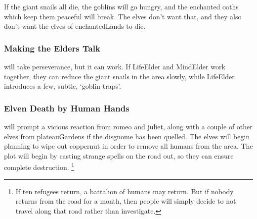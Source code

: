 \begin{multicols}{2}
If the giant snails all die, the goblins will go hungry, and the enchanted oaths which keep them peaceful will break.
The elves don't want that, and they also don't want the elves of \gls{enchantedLands} to die.

\stopcontents[segments]

\subsubsection{Making the Elders Talk}
will take perseverance, but it can work.
If \gls{LifeElder} and \gls{MindElder} work together, they can  reduce the giant snails in the area slowly, while \gls{LifeElder} introduces a few, subtle, `goblin-traps'.

\subsubsection{Elven Death by Human Hands}
will prompt a vicious reaction from \gls{romeo} and \gls{juliet}, along with a couple of other elves from \gls{plateauGardens} if the \gls{disgnome} has been quelled.
The elves will begin planning to wipe out \gls{coppernut} in order to remove all humans from the area.
The plot will begin by casting strange spells on the road out, so they can ensure complete destruction.%
\footnote{If ten refugees return, a battalion of humans may return.
But if nobody returns from the road for a month, then people will simply decide to not travel along that road rather than investigate.}

\iftoggle{verbose}{
  \subsection{Broken Resolutions}

  If your table runs out of time for the night, and you need to wrap everything up quickly, switch to \gls{downtime} plans, and give each \gls{pc} \pgls{action}.
  If they want to negotiate with \gls{MindElder}, they might roll \roll{Intelligence}{Empathy}, or if they think it's time to kill those \glspl{ogre}, sleeping in their \glspl{sepulchre}.

  For some added drama, ask each player to roll under a cup, napkin, or sleeve.
  Leave the \gls{natural} hidden until everyone has decided what they want to do.
  One all results are in, determine the outcomes based entirely on the rolls.
  If \pgls{pc} spent the entire \gls{downtime} trying to redirect the river through \gls{shadepaths}, it could \gls{flood} the \gls{sunway} and block snails from accessing \gls{ravencops}.
  Or if they spent their time trying to kill \glspl{ogre}, a failed roll could mean that \pgls{ogre} eats the \gls{pc} alive before marauding around \gls{ravencops}.
}{

}
\end{multicols}
